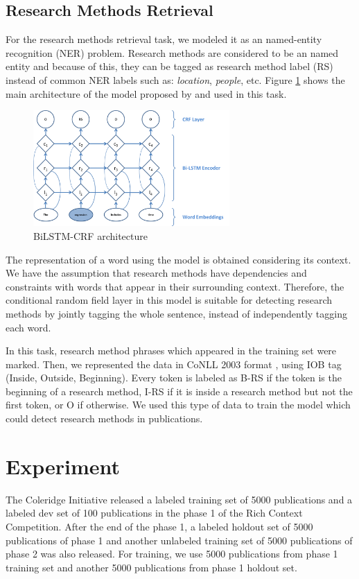 \documentclass[11pt]{article}
\begin{document}
\subsection{Research Methods Retrieval}
For the research methods retrieval task, we modeled it as an named-entity recognition (NER) problem. Research methods are considered to be an named entity and because of this, they can be tagged as research method label (RS) instead of common NER labels such as: \textit{location}, \textit{people}, etc. Figure \ref{fig:research_method} shows the main architecture of the model proposed by \cite{lample2016neural} and used in this task.

\begin{figure}
    \centering
    \includegraphics[width = 7.5cm]{bi-lstm.png}
    \caption{BiLSTM-CRF architecture}
    \label{fig:research_method}
\end{figure}

The representation of a word using the model is obtained  considering its context. We have the assumption that research methods have dependencies and constraints with words that appear in their surrounding context. Therefore, the conditional random field \cite{lafferty2001conditional} layer in this model is suitable for detecting research methods by jointly tagging the whole sentence, instead of independently tagging each word.

In this task, research method phrases which appeared in the training set were marked. Then, we represented the data in CoNLL 2003 format \cite{tjong2003introduction}, using IOB tag (Inside, Outside, Beginning). Every token is labeled as B-RS if the token is the beginning of a research method, I-RS if it is inside a research method but not the first token, or O if otherwise. We used this type of data to train the model which could detect research methods in publications. 

\section{Experiment}
The Coleridge Initiative released a labeled training set of 5000 publications and a labeled dev set of 100 publications in the phase 1 of the Rich Context Competition. After the end of the phase 1, a labeled holdout set of 5000 publications of phase 1 and another unlabeled training set of 5000 publications of phase 2 was also released. For training, we use 5000 publications from phase 1 training set and another 5000 publications from phase 1 holdout set. 
\end{document}
